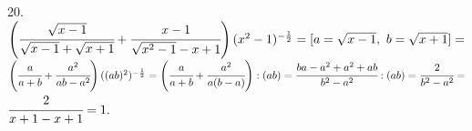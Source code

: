 20. $\left(\cfrac{\sqrt{x-1}}{\sqrt{x-1}+\sqrt{x+1}}+\cfrac{x-1}{\sqrt{x^2-1}-x+1}\right)(x^2-1)^{-\frac{1}{2}}=[a=\sqrt{x-1},\ b=\sqrt{x+1}]=$\\$
\left(\cfrac{a}{a+b}+\cfrac{a^2}{ab-a^2}\right)((ab)^2)^{-\frac{1}{2}}=\left(\cfrac{a}{a+b}+\cfrac{a^2}{a(b-a)}\right):(ab)=
\cfrac{ba-a^2+a^2+ab}{b^2-a^2}:(ab)=\cfrac{2}{b^2-a^2}=$\\$\cfrac{2}{x+1-x+1}=1.$\\

